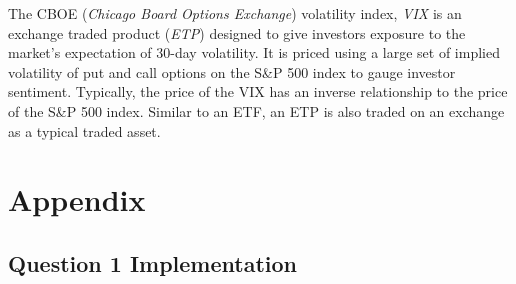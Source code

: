 \documentclass[10pt]{article}
\newcommand*\lstinputpath[1]{\lstset{inputpath=#1}} %
\begin{document}
        The CBOE (\textit{Chicago Board Options Exchange}) volatility index, \textit{VIX} is an exchange traded product (\textit{ETP}) designed to give investors exposure to the market's expectation of 30-day volatility. It is priced using a large set of implied volatility of put and call options on the S\&P 500 index to gauge investor sentiment. Typically, the price of the VIX has an inverse relationship to the price of the S\&P 500 index. Similar to an ETF, an ETP is also traded on an exchange as a typical traded asset.



\newpage

\printbibliography



\newpage

\appendix

\lstinputpath{question_solutions}

\section{Appendix} \label{appendix:source}

    \subsection{Question 1 Implementation}
    \label{appendix:source:q1}

        

\end{document}

